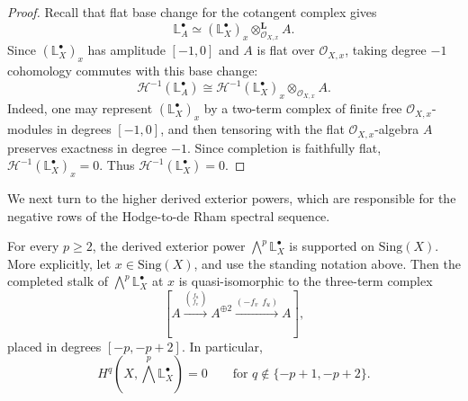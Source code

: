 \documentclass[12pt,reqno]{amsart}
\begin{document}
\begin{proof}
Recall that flat base change for the cotangent complex gives
\[
\mathbb{L}^{\bullet}_A \simeq (\mathbb{L}^{\bullet}_X)_x\otimes_{\mathcal O_{X,x}}^{\mathbf L} A.
\]
Since \((\mathbb{L}^{\bullet}_X)_x\) has amplitude \([-1,0]\) and \(A\) is flat over \(\mathcal O_{X,x}\), taking degree \(-1\) cohomology commutes with this base change:
\[
\mathcal H^{-1}(\mathbb{L}^{\bullet}_A)\cong \mathcal H^{-1}(\mathbb{L}^{\bullet}_X)_x\otimes_{\mathcal O_{X,x}} A.
\]
Indeed, one may represent \((\mathbb{L}^{\bullet}_X)_x\) by a two-term complex of finite free \(\mathcal O_{X,x}\)-modules in degrees \([-1,0]\), and then tensoring with the flat \(\mathcal O_{X,x}\)-algebra \(A\) preserves exactness in degree \(-1\).
Since completion is faithfully flat, \(\mathcal H^{-1}(\mathbb{L}^{\bullet}_X)_x=0\). Thus \(\mathcal H^{-1}(\mathbb{L}^{\bullet}_X)=0\).

\end{proof}

We next turn to the higher derived exterior powers, which are responsible for the negative rows of the Hodge-to-de Rham spectral sequence.

\begin{lemma}\label{lem:plane-exterior-powers}
For every \(p\ge 2\), the derived exterior power \(\bigwedge^p\mathbb{L}^{\bullet}_X\) is supported on \(\mathrm{Sing}(X)\). More explicitly, let \(x\in \mathrm{Sing}(X)\), and use the standing notation above.
Then the completed stalk of \(\bigwedge^p\mathbb{L}^{\bullet}_X\) at \(x\) is quasi-isomorphic to the three-term complex
\[
\left[
A \xrightarrow{\binom{f_u}{f_v}} A^{\oplus 2}
\xrightarrow{(-f_v\ \ f_u)} A
\right],
\]
placed in degrees \([-p,-p+2]\). In particular,
\[
H^q\!\left(X,\bigwedge^p\mathbb{L}^{\bullet}_X\right)=0
\qquad\text{for } q\notin\{-p+1,-p+2\}.
\]
\end{lemma}
\end{document}

